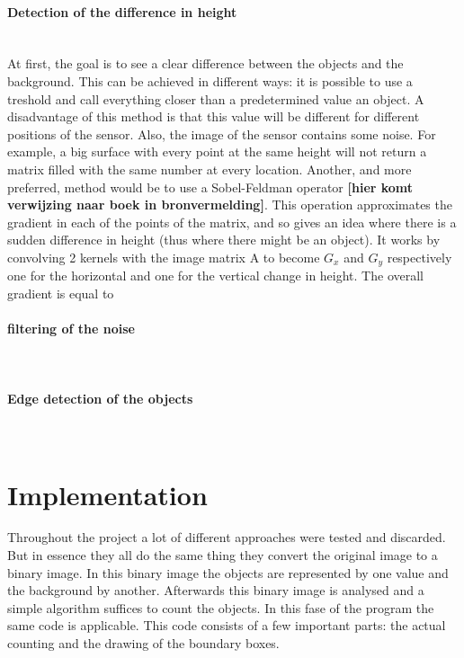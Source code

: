 \documentclass[11pt]{article}
\begin{document}
\paragraph{Detection of the difference in height}\mbox{}\\
At first, the goal is to see a clear difference between the objects and the background. This can be achieved in different ways: it is possible to use a treshold and call everything closer than a predetermined value an object. A disadvantage of this method is that this value will be different for different positions of the sensor. Also, the image of the sensor contains some noise. For example, a big surface with every point at the same height will not return a matrix filled with the same number at every location. Another, and more preferred, method would be to use a Sobel-Feldman operator \textbf{[hier komt verwijzing naar boek in bronvermelding]}. This operation approximates the gradient in each of the points of the matrix, and so gives an idea where there is a sudden difference in height (thus where there might be an object). It works by convolving 2 kernels with the image matrix A to become $G_{x}$ and $G_{y}$ respectively one for the horizontal and one for the vertical change in height. The overall gradient is equal to 
\paragraph{filtering of the noise}\mbox{}\\

\paragraph{Edge detection of the objects}\mbox{}\\

\section{Implementation}
Throughout the project a lot of different approaches were tested and discarded. But in essence they all do the same thing they convert the original image to a binary image. In this binary image the objects are represented by one value and the background by another. Afterwards this binary image is analysed and a simple algorithm suffices to count the objects. In this fase of the program the same code is applicable. This code consists of a few important parts: the actual counting and the drawing of the boundary boxes. 
\end{document}
